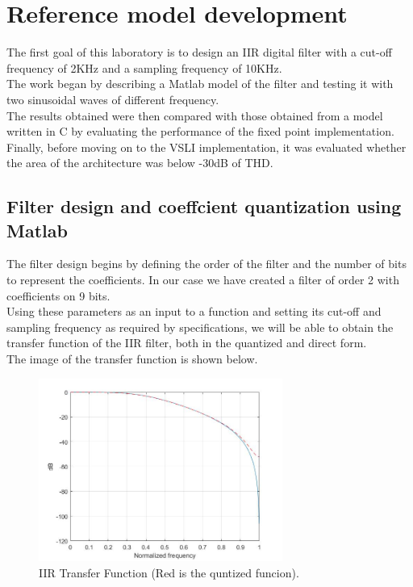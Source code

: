 \chapter{Reference model development}
\label{chap1}

The first goal of this laboratory is to design an IIR digital filter with a cut-off frequency of 2KHz and a sampling frequency of 10KHz.\\
The work began by describing a Matlab model of the filter and testing it with two sinusoidal waves of different frequency.\\
The results obtained were then compared with those obtained from a model written in C by evaluating the performance of the fixed point implementation.\\
Finally, before moving on to the VSLI implementation, it was evaluated whether the area of the architecture was below -30dB of THD.

\section{Filter design and coeffcient quantization using Matlab}

The filter design begins by defining the order of the filter and the number of bits to represent the coefficients.
In our case we have created a filter of order 2 with coefficients on 9 bits.\\
Using these parameters as an input to a function and setting its cut-off and sampling frequency as required by specifications, we will be able to obtain the transfer function of the IIR filter, both in the quantized and direct form.\\
The image of the transfer function is shown below.\\

\begin{figure}[H]
	\centering
	\includegraphics[width=8cm, height=6cm]{img/transfer_func.jpg} 
	\caption{IIR Transfer Function (Red is the quntized funcion).}
	\label{fig:IIR Transfer Function} 
\end{figure}

